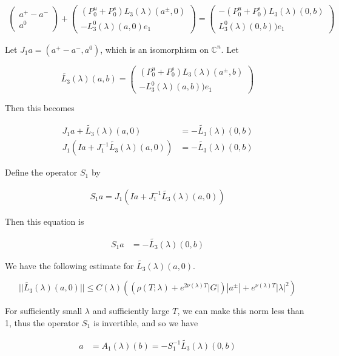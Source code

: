 \documentclass[12pt]{article}
\def\C{{\mathbb C}}
\begin{document}
\begin{enumerate}
\begin{align*}
\begin{pmatrix}a^+ - a^- \\ a^0 \end{pmatrix}
+ \begin{pmatrix}(P^u_0 + P^s_0) L_3(\lambda)(a^\pm,0) \\ - L^0_3(\lambda)(a, 0) e_1
\end{pmatrix}
=
\begin{pmatrix}-(P^u_0 + P^s_0) L_3(\lambda)(0,b) \\ L^0_3(\lambda)(0, b) ) e_1
\end{pmatrix}
\end{align*}


Let $J_1 a = (a^+ - a^-, a^0)$, which is an isomorphism on $\C^n$. Let 

\[
\tilde{L_3}(\lambda)(a,b) = \begin{pmatrix}
(P^u_0 + P^s_0) L_3(\lambda)(a^\pm,b) \\
-L^0_3(\lambda)(a, b) ) e_1
\end{pmatrix}
\]

Then this becomes

\begin{align*}
J_1 a + \tilde{L_3}(\lambda)(a,0) &= -\tilde{L_3}(\lambda)(0,b) \\
J_1 (I a + J_1^{-1} \tilde{L_3}(\lambda)(a,0) ) &= -\tilde{L_3}(\lambda)(0,b)
\end{align*}

Define the operator $S_1$ by

\begin{align*}
S_1 a = J_1 (Ia + J_1^{-1} \tilde{L_3}(\lambda)(a,0) )
\end{align*} 

Then this equation is

\begin{align*}
S_1 a &= -\tilde{L_3}(\lambda)(0,b)
\end{align*}

We have the following estimate for $\tilde{L_3}(\lambda)(a,0)$.

\[
||\tilde{L_3}(\lambda)(a,0)|| \leq C(\lambda)((\rho(T; \lambda) + e^{2 \nu(\lambda)T}|G|)|a^\pm| +e^{\nu(\lambda)T} |\lambda|^2) 
\]

For sufficiently small $\lambda$ and sufficiently large $T$, we can make this norm less than 1, thus the operator $S_1$ is invertible, and so we have

\begin{align*}
a &= A_1(\lambda)(b) = -S_1^{-1} \tilde{L_3}(\lambda)(0,b)
\end{align*}


\end{enumerate}
\end{document}

